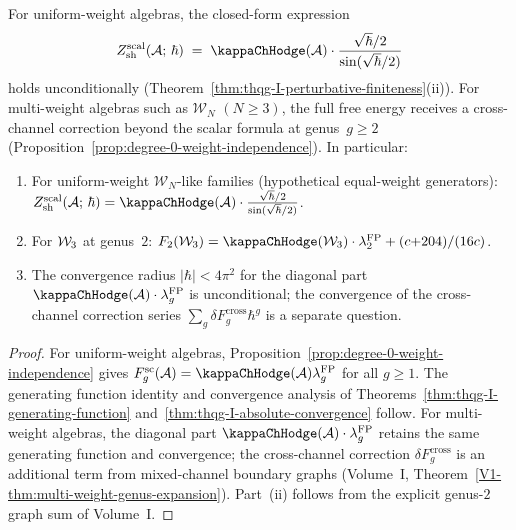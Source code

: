 \begin{corollary}
\label{cor:scalar-lane-upgrade}
For uniform-weight algebras, the closed-form expression
\begin{equation}\label{eq:upgraded-scalar}
Z_{\mathrm{sh}}^{\mathrm{scal}}(\cA;\,\hbar)
\;=\; \kappaChHodge(\cA) \cdot
\frac{\sqrt{\hbar}/2}{\sin(\sqrt{\hbar}/2)}
\end{equation}
holds unconditionally
\textup{(}Theorem~\textup{\ref{thm:thqg-I-perturbative-finiteness}(ii))}.
For multi-weight algebras such as\/ $\mathcal{W}_N$
$(N \geq 3)$, the full free energy receives a cross-channel
correction beyond the scalar formula at genus~$g \geq 2$
\textup{(}Proposition~\textup{\ref{prop:degree-0-weight-independence})}.
In particular:
\begin{enumerate}[label=\textup{(\roman*)}]
\item For uniform-weight $\mathcal{W}_N$-like families \textup{(}hypothetical
 equal-weight generators\textup{)}:
 $Z_{\mathrm{sh}}^{\mathrm{scal}}(\cA;\,\hbar) = \kappaChHodge(\cA) \cdot
 \frac{\sqrt{\hbar}/2}{\sin(\sqrt{\hbar}/2)}$.
\item For $\mathcal{W}_3$ at genus~$2$: $F_2(\cW_3) = \kappaChHodge(\cW_3) \cdot
 \lambda_2^{\mathrm{FP}} + (c{+}204)/(16c)$.
\item The convergence radius $|\hbar| < 4\pi^2$ for the
 diagonal part $\kappaChHodge(\cA) \cdot \lambda_g^{\mathrm{FP}}$ is
 unconditional; the convergence of the cross-channel
 correction series $\sum_g \delta F_g^{\mathrm{cross}} \hbar^g$
 is a separate question.
\end{enumerate}
\end{corollary}

\begin{proof}
For uniform-weight algebras,
Proposition~\ref{prop:degree-0-weight-independence} gives
$F_g^{\mathrm{sc}}(\cA)=\kappaChHodge(\cA)\lambda_g^{\mathrm{FP}}$ for all
$g \geq 1$. The generating function identity and convergence
analysis of Theorems~\ref{thm:thqg-I-generating-function}
and~\ref{thm:thqg-I-absolute-convergence} follow.
For multi-weight algebras, the diagonal part
$\kappaChHodge(\cA) \cdot \lambda_g^{\mathrm{FP}}$ retains the same
generating function and convergence; the cross-channel
correction $\delta F_g^{\mathrm{cross}}$ is an additional term
from mixed-channel boundary graphs
\textup{(}Volume~I, Theorem~\textup{\ref*{V1-thm:multi-weight-genus-expansion}}\textup{)}.
Part~(ii) follows from the explicit genus-$2$ graph sum
of Volume~I.
\end{proof}

